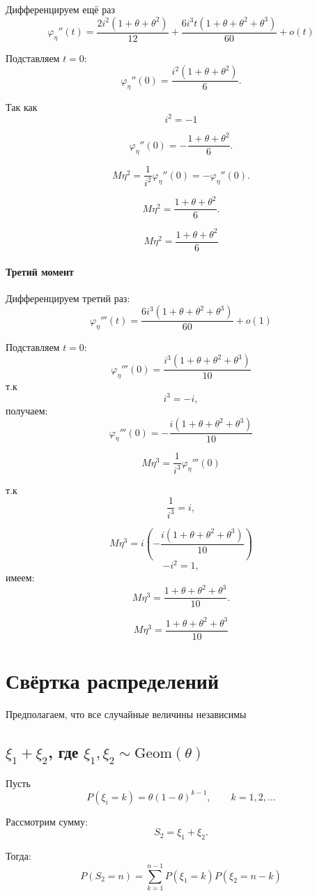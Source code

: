 \documentclass[12pt,a4paper]{article}
\theoremstyle{definition}
\begin{document}
Дифференцируем ещё раз
\[\varphi_\eta''(t)=
\frac{2i^2(1+\theta+\theta^2)}{12}
+
\frac{6i^3t(1+\theta+\theta^2+\theta^3)}{60}+o(t)\]

Подставляем $t=0$:
\[\varphi_\eta''(0)
=
\frac{i^2(1+\theta+\theta^2)}{6}.\]

Так как
\[i^2=-1\]

\[\varphi_\eta''(0)=-\frac{1+\theta+\theta^2}{6}.\]

\[M\eta^2=\frac1{i^2}\varphi_\eta''(0)
=-\varphi_\eta''(0).\]

\[M\eta^2=\frac{1+\theta+\theta^2}{6}.\]

\[\boxed{M\eta^2=\frac{1+\theta+\theta^2}{6}}\]

\paragraph{Третий момент}

Дифференцируем третий раз:
\[\varphi_\eta'''(t)
=\frac{6i^3(1+\theta+\theta^2+\theta^3)}{60}+o(1)\]

Подставляем $t=0$:
\[\varphi_\eta'''(0)=\frac{i^3(1+\theta+\theta^2+\theta^3)}{10}\]
т.к
\[i^3=-i,\]
получаем:
\[\varphi_\eta'''(0)=-\frac{i(1+\theta+\theta^2+\theta^3)}{10}\]

\[M\eta^3=\frac1{i^3}\varphi_\eta'''(0)\]

т.к
\[\frac1{i^3}=i,\]

\[M\eta^3=i\left(
-\frac{i(1+\theta+\theta^2+\theta^3)}{10}
\right)\]
\[-i^2=1,\]
имеем:
\[M\eta^3=
\frac{1+\theta+\theta^2+\theta^3}{10}.\]

\[\boxed{
M\eta^3=
\frac{1+\theta+\theta^2+\theta^3}{10}}\]

\section{Свёртка распределений}

Предполагаем, что все случайные величины независимы

\subsection{\texorpdfstring
{$\xi_1+\xi_2$, где $\xi_1,\xi_2\sim \mathrm{Geom}(\theta)$}
{xi1+xi2, где xi1, xi2 ~ Geom(theta)}}

Пусть
\[P(\xi_i=k)=\theta(1-\theta)^{k-1},\qquad k=1,2,\dots\]

Рассмотрим сумму:
\[S_2=\xi_1+\xi_2.\]

Тогда:
\[P(S_2=n)=\sum_{k=1}^{n-1}
P(\xi_1=k)P(\xi_2=n-k)\]
\end{document}
